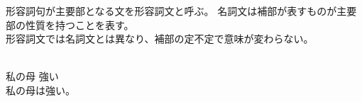 形容詞句が主要部となる文を形容詞文と呼ぶ。
名詞文は補部が表すものが主要部の性質を持つことを表す。\\
形容詞文では名詞文とは異なり、補部の定不定で意味が変わらない。

\begin{exe}
    \ex {} \\
        私の母 強い \\
    \glt 私の母は強い。
\end{exe}